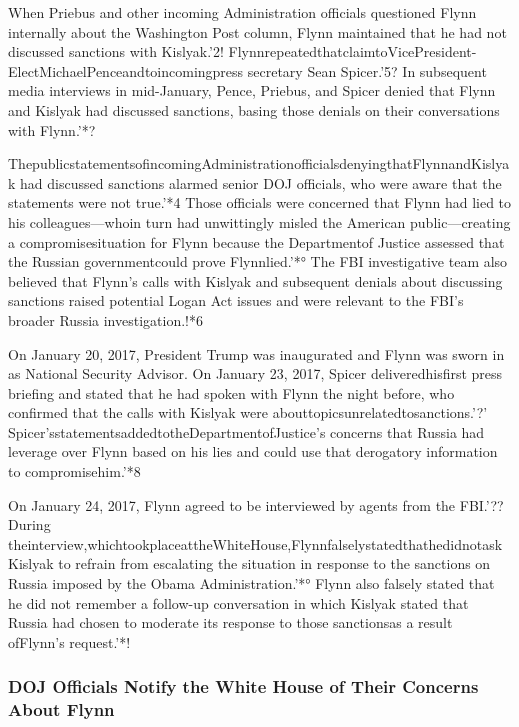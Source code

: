 When Priebus and other incoming Administration officials questioned Flynn internally about the Washington Post column, Flynn maintained that he had not discussed sanctions with Kislyak.'2! FlynnrepeatedthatclaimtoVicePresident-ElectMichaelPenceandtoincomingpress secretary Sean Spicer.'5? In subsequent media interviews in mid-January, Pence, Priebus, and Spicer denied that Flynn and Kislyak had discussed sanctions, basing those denials on their conversations with Flynn.'*?

ThepublicstatementsofincomingAdministrationofficialsdenyingthatFlynnandKislyak had discussed sanctions alarmed senior DOJ officials, who were aware that the statements were not true.'*4 Those officials were concerned that Flynn had lied to his colleagues—whoin turn had unwittingly misled the American public—creating a compromisesituation for Flynn because the Departmentof Justice assessed that the Russian governmentcould prove Flynnlied.'*° The FBI investigative team also believed that Flynn’s calls with Kislyak and subsequent denials about discussing sanctions raised potential Logan Act issues and were relevant to the FBI’s broader Russia investigation.!*6

On January 20, 2017, President Trump was inaugurated and Flynn was sworn in as National Security Advisor. On January 23, 2017, Spicer deliveredhisfirst press briefing and stated that he had spoken with Flynn the night before, who confirmed that the calls with Kislyak were abouttopicsunrelatedtosanctions.'?’ Spicer’sstatementsaddedtotheDepartmentofJustice’s concerns that Russia had leverage over Flynn based on his lies and could use that derogatory
information to compromisehim.'*8

On January 24, 2017, Flynn agreed to be interviewed by agents from the FBI.'?? During theinterview,whichtookplaceattheWhiteHouse,FlynnfalselystatedthathedidnotaskKislyak to refrain from escalating the situation in response to the sanctions on Russia imposed by the Obama Administration.'*° Flynn also falsely stated that he did not remember a follow-up conversation in which Kislyak stated that Russia had chosen to moderate its response to those sanctionsas a result ofFlynn’s request.'*!

\subsubsection{DOJ Officials Notify the White House of Their Concerns About Flynn}

